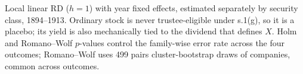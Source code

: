 Local linear RD ($h = 1$) with year fixed effects, estimated separately by security class, 1894--1913. Ordinary stock is never trustee-eligible under s.1(g), so it is a placebo; its yield is also mechanically tied to the dividend that defines $X$. Holm and Romano--Wolf $p$-values control the family-wise error rate across the four outcomes; Romano--Wolf uses 499 pairs cluster-bootstrap draws of companies, common across outcomes.

